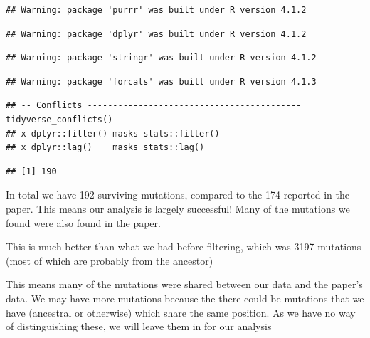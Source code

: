 \documentclass[
]{article}
\newenvironment{Shaded}{\begin{snugshade}}{\end{snugshade}}
\newcommand{\KeywordTok}[1]{\textcolor[rgb]{0.13,0.29,0.53}{\textbf{#1}}}
\newcommand{\NormalTok}[1]{#1}
\newcommand{\OperatorTok}[1]{\textcolor[rgb]{0.81,0.36,0.00}{\textbf{#1}}}
\newcommand{\StringTok}[1]{\textcolor[rgb]{0.31,0.60,0.02}{#1}}
\begin{document}
\begin{verbatim}
## Warning: package 'purrr' was built under R version 4.1.2
\end{verbatim}

\begin{verbatim}
## Warning: package 'dplyr' was built under R version 4.1.2
\end{verbatim}

\begin{verbatim}
## Warning: package 'stringr' was built under R version 4.1.2
\end{verbatim}

\begin{verbatim}
## Warning: package 'forcats' was built under R version 4.1.3
\end{verbatim}

\begin{verbatim}
## -- Conflicts ------------------------------------------ tidyverse_conflicts() --
## x dplyr::filter() masks stats::filter()
## x dplyr::lag()    masks stats::lag()
\end{verbatim}

\begin{Shaded}
\end{Shaded}

\begin{verbatim}
## [1] 190
\end{verbatim}

In total we have 192 surviving mutations, compared to the 174 reported
in the paper. This means our analysis is largely successful! Many of the
mutations we found were also found in the paper.

This is much better than what we had before filtering, which was 3197
mutations (most of which are probably from the ancestor)

This means many of the mutations were shared between our data and the
paper's data. We may have more mutations because the there could be
mutations that we have (ancestral or otherwise) which share the same
position. As we have no way of distinguishing these, we will leave them
in for our analysis
\end{document}
